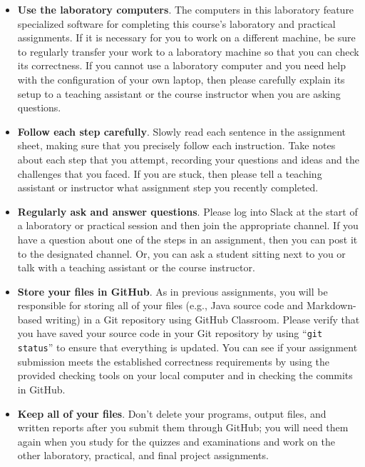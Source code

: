 \documentclass[11pt]{article}
\newcommand{\command}[1]{``\lstinline{#1}''}
\begin{document}
\begin{itemize}
  \setlength{\itemsep}{0pt}

\item {\bf Use the laboratory computers}. The computers in this laboratory feature specialized software for completing
  this course's laboratory and practical assignments. If it is necessary for you to work on a different machine, be sure
  to regularly transfer your work to a laboratory machine so that you can check its correctness. If you cannot use a
  laboratory computer and you need help with the configuration of your own laptop, then please carefully explain its
  setup to a teaching assistant or the course instructor when you are asking questions.

\item {\bf Follow each step carefully}. Slowly read each sentence in the assignment sheet, making sure that you
  precisely follow each instruction. Take notes about each step that you attempt, recording your questions and ideas and
  the challenges that you faced. If you are stuck, then please tell a teaching assistant or instructor what assignment
  step you recently completed.

\item {\bf Regularly ask and answer questions}. Please log into Slack at the start of a laboratory or practical session
  and then join the appropriate channel. If you have a question about one of the steps in an assignment, then you can
  post it to the designated channel. Or, you can ask a student sitting next to you or talk with a teaching assistant or
  the course instructor.

\item {\bf Store your files in GitHub}. As in previous assignments, you will be
  responsible for storing all of your files (e.g., Java source code and
  Markdown-based writing) in a Git repository using GitHub Classroom. Please
  verify that you have saved your source code in your Git repository by using
  \command{git status} to ensure that everything is updated. You can see if your
  assignment submission meets the established correctness requirements by using
  the provided checking tools on your local computer and in checking the commits
  in GitHub.

\item {\bf Keep all of your files}. Don't delete your programs, output files, and written reports after you submit them
  through GitHub; you will need them again when you study for the quizzes and examinations and work on the other
  laboratory, practical, and final project assignments.


\end{itemize}
\end{document}
